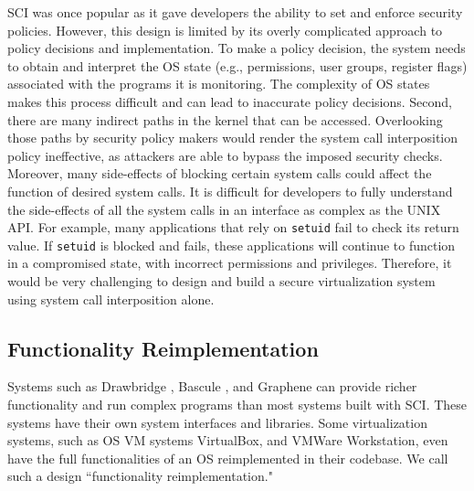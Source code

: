 SCI was once popular 
as it gave developers the ability to set and enforce security policies. 
However, this design
is limited by its overly complicated approach to policy decisions and implementation.
To make a policy decision, the system needs to
obtain and interpret the OS state (e.g., permissions, user groups, register flags) 
associated with the programs it is monitoring.
The complexity of OS states makes this process difficult and can lead to
inaccurate policy decisions.
Second, there are many indirect paths in the kernel that can be accessed.
Overlooking those paths by security policy makers would render the
system call interposition policy ineffective, as attackers are able to
bypass the imposed security checks. 
Moreover, many side-effects of blocking
certain system calls could affect the function of desired system calls.
It is difficult for developers to fully understand the side-effects of all the
system calls in an interface as complex as the UNIX API. 
For example, many applications that rely on \texttt{setuid} fail to check its return value. 
If \texttt{setuid} is blocked and fails, these applications will continue to function in a compromised state, 
with incorrect permissions and privileges. 
Therefore, it would be very challenging to design and build a secure virtualization system using
system call interposition alone.

\subsection{Functionality Reimplementation}
Systems such as  Drawbridge \cite{Drawbridge-11},
 Bascule \cite{Bascule}, and Graphene \cite{Graphene-14} can
provide richer functionality and run complex programs than most systems built
with SCI. These systems have their own system
interfaces and libraries. Some virtualization
systems, such as OS VM systems VirtualBox, and VMWare Workstation, even have the
full functionalities of an OS reimplemented in their codebase. We call such a design
``functionality reimplementation."

